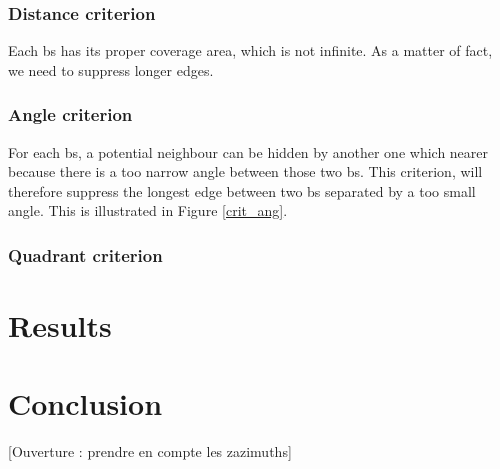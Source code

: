 \documentclass[lettersize,journal,english]{IEEEtran}
\begin{document}
\subsubsection{Distance criterion}
Each \acrshort{bs} has its proper coverage area, which is not infinite. As a matter of fact, we need to suppress longer edges.

\subsubsection{Angle criterion}
For each \acrshort{bs}, a potential neighbour can be \og hidden\fg{} by another one which nearer because there is a too narrow angle between those two \acrshort{bs}.
This criterion, will therefore suppress the longest edge between two \acrshort{bs} separated by a too small angle. This is illustrated in Figure \ref{crit_ang}.

\subsubsection{Quadrant criterion}

\section{Results}

\section{Conclusion}

[Ouverture : prendre en compte les zazimuths]

\printglossary[type=\acronymtype]
\printglossary



\end{document}
